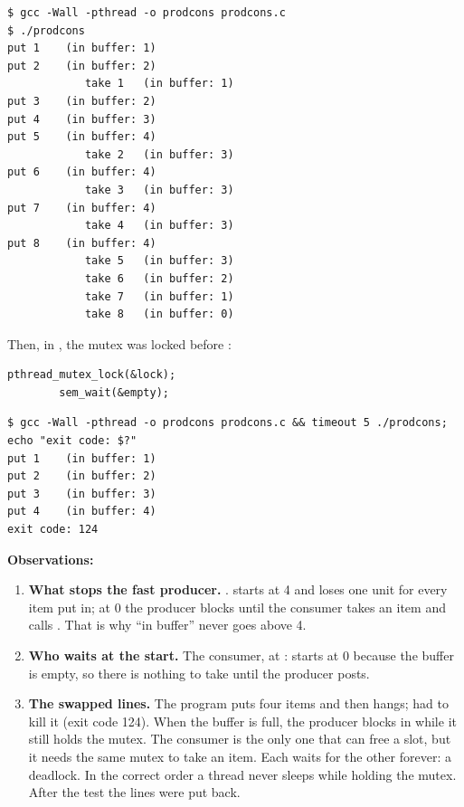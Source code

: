 \documentclass[11pt,a4paper]{article}
\begin{document}
\begin{lstlisting}[caption={prodcons}]
$ gcc -Wall -pthread -o prodcons prodcons.c
$ ./prodcons
put 1    (in buffer: 1)
put 2    (in buffer: 2)
            take 1   (in buffer: 1)
put 3    (in buffer: 2)
put 4    (in buffer: 3)
put 5    (in buffer: 4)
            take 2   (in buffer: 3)
put 6    (in buffer: 4)
            take 3   (in buffer: 3)
put 7    (in buffer: 4)
            take 4   (in buffer: 3)
put 8    (in buffer: 4)
            take 5   (in buffer: 3)
            take 6   (in buffer: 2)
            take 7   (in buffer: 1)
            take 8   (in buffer: 0)
\end{lstlisting}

Then, in , the mutex was locked before :

\begin{lstlisting}[style=ccode,caption={The two lines of producer(), swapped}]
        pthread_mutex_lock(&lock);
        sem_wait(&empty);
\end{lstlisting}

\begin{lstlisting}[caption={prodcons with the lines swapped}]
$ gcc -Wall -pthread -o prodcons prodcons.c && timeout 5 ./prodcons; echo "exit code: $?"
put 1    (in buffer: 1)
put 2    (in buffer: 2)
put 3    (in buffer: 3)
put 4    (in buffer: 4)
exit code: 124
\end{lstlisting}

\textbf{Observations:}
\begin{enumerate}
  \item \textbf{What stops the fast producer.} .  starts
  at 4 and loses one unit for every item put in; at 0 the producer blocks until the consumer
  takes an item and calls . That is why ``in buffer'' never goes above
  4.
  \item \textbf{Who waits at the start.} The consumer, at : 
  starts at 0 because the buffer is empty, so there is nothing to take until the producer posts.
  \item \textbf{The swapped lines.} The program puts four items and then hangs; 
  had to kill it (exit code 124). When the buffer is full, the producer blocks in
   while it still holds the mutex. The consumer is the only one that
  can free a slot, but it needs the same mutex to take an item. Each waits for the other
  forever: a deadlock. In the correct order a thread never sleeps while holding the mutex. After
  the test the lines were put back.
\end{enumerate}
\end{document}
